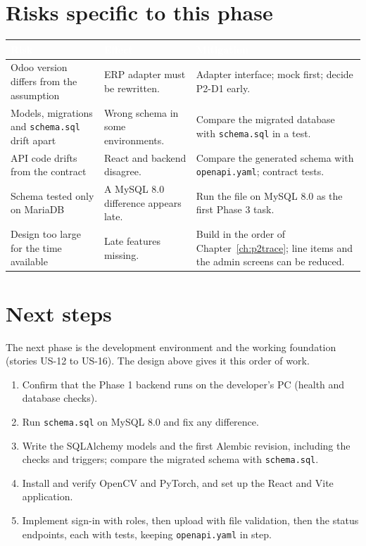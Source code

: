 \documentclass[11pt,a4paper]{report}
\newcommand{\hdr}[1]{\textcolor{white}{\sffamily\bfseries #1}}
\newcommand{\tblstart}{\rowcolors{2}{white}{rowgray}\arrayrulecolor{teal!60}}
\newcommand{\hdrrow}{\rowcolor{navy}}
\begin{document}
\section{Risks specific to this phase}
{\tblstart\small
\begin{longtable}{L{4.4cm}L{4.4cm}L{5.0cm}}
\hdrrow \hdr{Risk} & \hdr{Effect} & \hdr{Mitigation}\\ \endhead
Odoo version differs from the assumption & ERP adapter must be rewritten. & Adapter interface; mock first; decide P2-D1 early.\\
Models, migrations and \texttt{schema.sql} drift apart & Wrong schema in some environments. & Compare the migrated database with \texttt{schema.sql} in a test.\\
API code drifts from the contract & React and backend disagree. & Compare the generated schema with \texttt{openapi.yaml}; contract tests.\\
Schema tested only on MariaDB & A MySQL 8.0 difference appears late. & Run the file on MySQL 8.0 as the first Phase 3 task.\\
Design too large for the time available & Late features missing. & Build in the order of Chapter~\ref{ch:p2trace}; line items and the admin screens can be reduced.\\
\hline
\end{longtable}}

\section{Next steps}
The next phase is the development environment and the working foundation (stories US-12 to US-16). The design above gives it this order of work.
\begin{enumerate}
\item Confirm that the Phase 1 backend runs on the developer's PC (health and database checks).
\item Run \texttt{schema.sql} on MySQL 8.0 and fix any difference.
\item Write the SQLAlchemy models and the first Alembic revision, including the checks and triggers; compare the migrated schema with \texttt{schema.sql}.
\item Install and verify OpenCV and PyTorch, and set up the React and Vite application.
\item Implement sign-in with roles, then upload with file validation, then the status endpoints, each with tests, keeping \texttt{openapi.yaml} in step.
\end{enumerate}
\end{document}
